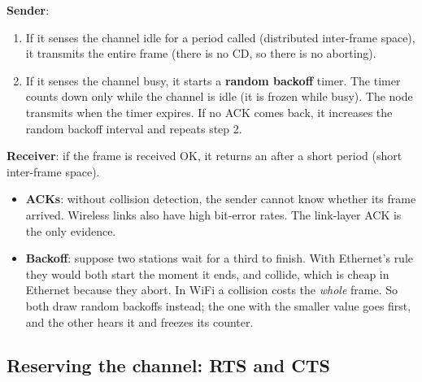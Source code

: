 \begin{defn}
\textbf{Sender}:
\begin{enumerate}
  \item If it senses the channel idle for a period called  (distributed inter-frame space), it transmits the entire frame (there is no CD, so there is no aborting).
  \item If it senses the channel busy, it starts a \textbf{random backoff} timer. The timer counts down only while the channel is idle (it is frozen while busy). The node transmits when the timer expires.
        If no ACK comes back, it increases the random backoff interval and repeats step 2.
\end{enumerate}
\textbf{Receiver}: if the frame is received OK, it returns an  after a short period  (short inter-frame space).
\end{defn}


\begin{intuition}
\begin{itemize}
  \item \textbf{ACKs}: without collision detection, the sender cannot know whether its frame arrived. Wireless links also have high bit-error rates. The link-layer ACK is the only evidence.
  \item \textbf{Backoff}: suppose two stations wait for a third to finish. With Ethernet's rule they would both start the moment it ends, and collide, which is cheap in Ethernet because they abort.
        In WiFi a collision costs the \emph{whole} frame. So both draw random backoffs instead; the one with the smaller value goes first, and the other hears it and freezes its counter.
\end{itemize}
\end{intuition}

\subsection{Reserving the channel: RTS and CTS}

